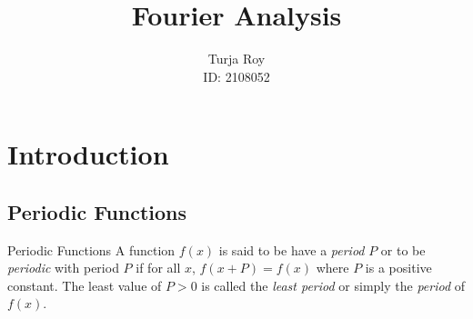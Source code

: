 \documentclass[12pt]{article}
\title{
    \textbf{Fourier Analysis}
}
\author{
    Turja Roy\\
    ID: 2108052
}
\date{}
\numberwithin{equation}{subsection}
\begin{document}
\maketitle
\tableofcontents
\newpage


\section{Introduction}

\subsection{Periodic Functions}
\begin{definition}{Periodic Functions}{}
    A function $f(x)$ is said to be have a \textit{period} $P$ or to be \textit{periodic} with period $P$ if for all $x$, $f(x+P) = f(x)$ where $P$ is a positive constant. The least value of $P>0$ is called the \textit{least period} or simply the \textit{period} of $f(x)$.
\end{definition}
\end{document}
